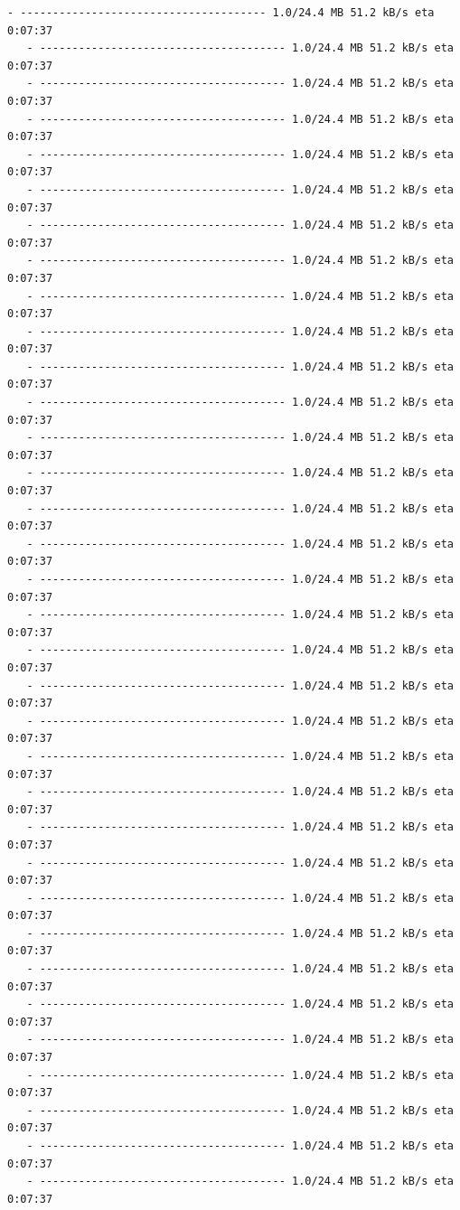 \documentclass[11pt]{article}
\begin{document}
\begin{Verbatim}[commandchars=\\\{\}]
   - -------------------------------------- 1.0/24.4 MB 51.2 kB/s eta 0:07:37
   - -------------------------------------- 1.0/24.4 MB 51.2 kB/s eta 0:07:37
   - -------------------------------------- 1.0/24.4 MB 51.2 kB/s eta 0:07:37
   - -------------------------------------- 1.0/24.4 MB 51.2 kB/s eta 0:07:37
   - -------------------------------------- 1.0/24.4 MB 51.2 kB/s eta 0:07:37
   - -------------------------------------- 1.0/24.4 MB 51.2 kB/s eta 0:07:37
   - -------------------------------------- 1.0/24.4 MB 51.2 kB/s eta 0:07:37
   - -------------------------------------- 1.0/24.4 MB 51.2 kB/s eta 0:07:37
   - -------------------------------------- 1.0/24.4 MB 51.2 kB/s eta 0:07:37
   - -------------------------------------- 1.0/24.4 MB 51.2 kB/s eta 0:07:37
   - -------------------------------------- 1.0/24.4 MB 51.2 kB/s eta 0:07:37
   - -------------------------------------- 1.0/24.4 MB 51.2 kB/s eta 0:07:37
   - -------------------------------------- 1.0/24.4 MB 51.2 kB/s eta 0:07:37
   - -------------------------------------- 1.0/24.4 MB 51.2 kB/s eta 0:07:37
   - -------------------------------------- 1.0/24.4 MB 51.2 kB/s eta 0:07:37
   - -------------------------------------- 1.0/24.4 MB 51.2 kB/s eta 0:07:37
   - -------------------------------------- 1.0/24.4 MB 51.2 kB/s eta 0:07:37
   - -------------------------------------- 1.0/24.4 MB 51.2 kB/s eta 0:07:37
   - -------------------------------------- 1.0/24.4 MB 51.2 kB/s eta 0:07:37
   - -------------------------------------- 1.0/24.4 MB 51.2 kB/s eta 0:07:37
   - -------------------------------------- 1.0/24.4 MB 51.2 kB/s eta 0:07:37
   - -------------------------------------- 1.0/24.4 MB 51.2 kB/s eta 0:07:37
   - -------------------------------------- 1.0/24.4 MB 51.2 kB/s eta 0:07:37
   - -------------------------------------- 1.0/24.4 MB 51.2 kB/s eta 0:07:37
   - -------------------------------------- 1.0/24.4 MB 51.2 kB/s eta 0:07:37
   - -------------------------------------- 1.0/24.4 MB 51.2 kB/s eta 0:07:37
   - -------------------------------------- 1.0/24.4 MB 51.2 kB/s eta 0:07:37
   - -------------------------------------- 1.0/24.4 MB 51.2 kB/s eta 0:07:37
   - -------------------------------------- 1.0/24.4 MB 51.2 kB/s eta 0:07:37
   - -------------------------------------- 1.0/24.4 MB 51.2 kB/s eta 0:07:37
   - -------------------------------------- 1.0/24.4 MB 51.2 kB/s eta 0:07:37
   - -------------------------------------- 1.0/24.4 MB 51.2 kB/s eta 0:07:37
   - -------------------------------------- 1.0/24.4 MB 51.2 kB/s eta 0:07:37
   - -------------------------------------- 1.0/24.4 MB 51.2 kB/s eta 0:07:37

\end{Verbatim}
\end{document}
